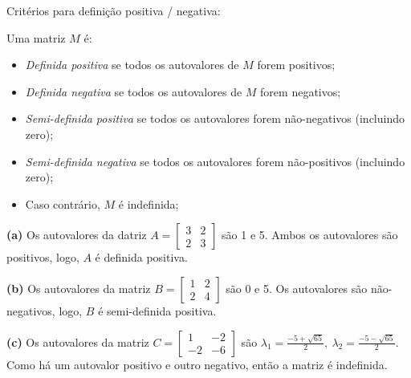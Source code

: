 \begin{resolution}
  Critérios para definição positiva / negativa:

  Uma matriz \( M \) é:
  \begin{itemize}
    \item {\it Definida positiva} se todos os autovalores de \( M \) forem positivos;
    \item {\it Definida negativa} se todos os autovalores de \( M \) forem negativos;
    \item {\it Semi-definida positiva} se todos os autovalores forem não-negativos (incluindo zero);
    \item {\it Semi-definida negativa} se todos os autovalores forem não-positivos (incluindo zero);
    \item Caso contrário, \( M \) é indefinida;
  \end{itemize}

  {\bf (a)} Os autovalores da datriz \( A = \begin{bmatrix} 3 & 2 \\ 2 & 3 \end{bmatrix} \) são 1 e 5.
  Ambos os autovalores são positivos, logo, \( A \) é definida positiva.

    {\bf (b)} Os autovalores da matriz \( B = \begin{bmatrix} 1 & 2 \\ 2 & 4 \end{bmatrix} \) são 0 e 5. Os autovalores são não-negativos, logo, \( B \) é semi-definida positiva.

    {\bf (c)} Os autovalores da matriz \( C = \begin{bmatrix} 1 & -2 \\ -2 & -6 \end{bmatrix} \) são $λ_1=\frac{-5+\sqrt{65}}{2},\:λ_2=\frac{-5-\sqrt{65}}{2}$. Como há um autovalor positivo e outro negativo, então a matriz é indefinida.
\end{resolution}


